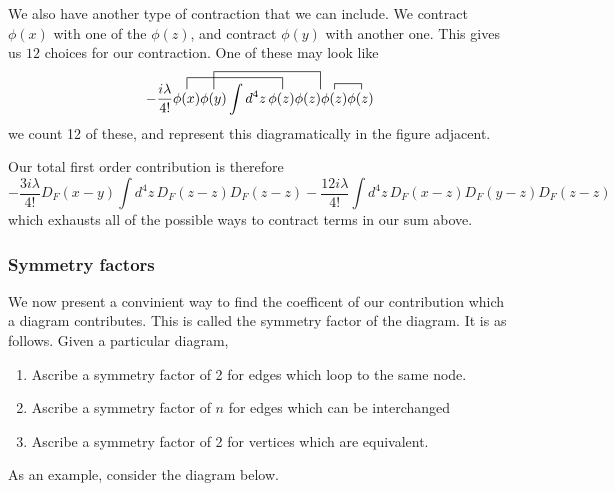\begin{figure}[!h] 
\centering
{}  
\end{figure} 

We also have another type of contraction that we can include. We contract $\phi(x)$ with one of the $\phi(z)$, and contract $\phi(y) $ with another one. This gives us $12$ choices for our contraction. One of these may look like \[  - \frac{i \lambda}{ 4!} \contraction[2ex]{}{\phi(x) } {\phi(y) \int d^4 z \, }{ \phi(z) } \contraction[3ex]{ \phi(x) } { \phi(y) } { \int d^4 z \, phi(z ) }{\phi(z)} \phi(x) \phi(y ) \int d^4 z \, \phi(z) \phi(z) \contraction{}{\phi(z)} {} {\phi(z)} \phi(z) \phi(z)  \] we count 12 of these, and represent this diagramatically in the figure adjacent.  
\begin{figure}[!h] 
\centering
{}
\end{figure} 
Our total first order contribution is therefore \[ - \frac{ 3i\lambda }{ 4!} D_F(x - y )  \int d^4 z \, D_F(z - z)  D_F(z - z) - \frac{12 i \lambda}{ 4! } \int d^4 z \, D_F( x - z) D_F( y - z) D_F( z - z ) \] which exhausts all of the possible ways to contract terms in our sum above. 

\subsubsection{Symmetry factors} 
We now present a convinient way to find the coefficent of our contribution which a diagram contributes. This is called the symmetry factor of the diagram. It is as follows. Given a particular diagram, 
\begin{enumerate} 
\item Ascribe a symmetry factor of 2 for edges which loop to the same node. 
\item Ascribe a symmetry factor of $n$ for edges which can be interchanged
\item Ascribe a symmetry factor of 2 for vertices which are equivalent. 
\end{enumerate}
As an example, consider the diagram below. 

\pagebreak
